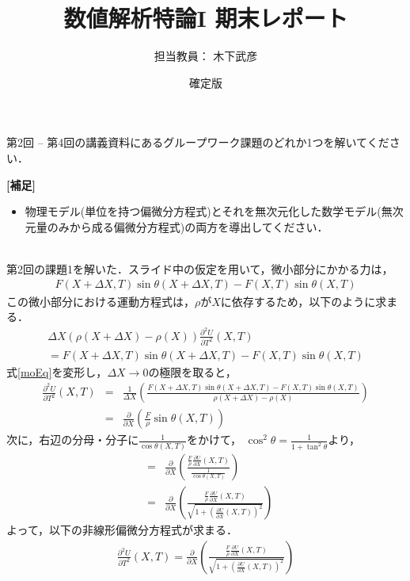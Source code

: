 \documentclass{jarticle}
\title{数値解析特論I 期末レポート}
\author{担当教員： 木下武彦}
\date{確定版}
\newcommand{\prob}[1]{\fbox{\Large \,#1\,}}
\newcommand{\ans}[0]{\fbox{解答}\\}
\begin{document}
\maketitle
\prob{1} 第2回 -- 第4回の講義資料にあるグループワーク課題のどれか1つを解いてください．

\textbf{[補足]}
\begin{itemize}
\item 物理モデル(単位を持つ偏微分方程式)とそれを無次元化した数学モデル(無次元量のみから成る偏微分方程式)の両方を導出してください．
\end{itemize}

\ans{}
第2回の課題1を解いた．スライド中の仮定を用いて，微小部分にかかる力は，
\begin{eqnarray}
  F(X + \Delta X, T) \sin\theta(X + \Delta X, T) - F(X, T) \sin\theta(X, T)
  \label{braEq}
\end{eqnarray}
この微小部分における運動方程式は，$\rho$が$X$に依存するため，以下のように求まる．
\begin{eqnarray}
  \Delta X( \rho(X+\Delta X) - \rho(X) ) \frac{ \partial^2 U }{ \partial T^2 }(X,T) \nonumber \\
  = F(X + \Delta X, T) \sin\theta(X + \Delta X, T) - F(X, T) \sin\theta(X, T)
  \label{moEq}
\end{eqnarray}
式\ref{moEq}を変形し，$\Delta X \rightarrow 0$の極限を取ると，
\begin{eqnarray*}
  \frac{ \partial^2 U }{ \partial T^2 }(X,T) &=&
  \frac{1}{\Delta X} \left( \frac{ F(X + \Delta X, T) \sin\theta(X + \Delta X, T) - F(X, T) \sin\theta(X, T) }{ \rho(X+\Delta X) - \rho(X) } \right) \\
  &=& \frac{\partial}{\partial X} \left( \frac{F}{\rho} \sin\theta(X, T) \right)
\end{eqnarray*}
次に，右辺の分母・分子に$\frac{1}{\cos\theta(X, T)}$をかけて，
$\cos^2\theta = \frac{1}{1 + \tan^2\theta}$より，
\begin{eqnarray*}
  &=& \frac{\partial}{\partial X} \left( \frac{ \frac{F}{\rho} \frac{\partial U}{\partial X}(X,T) }{\frac{1}{\cos\theta(X, T)}} \right) \\
  &=& \frac{\partial}{\partial X} \left( \frac{ \frac{F}{\rho} \frac{\partial U}{\partial X}(X,T) }{\sqrt{1 + \left( \frac{\partial U}{\partial X}(X,T) \right)^2 }} \right)
\end{eqnarray*}
よって，以下の非線形偏微分方程式が求まる．
\begin{eqnarray}
  \frac{ \partial^2 U }{ \partial T^2 }(X,T) = \frac{\partial}{\partial X} \left( \frac{ \frac{F}{\rho} \frac{\partial U}{\partial X}(X,T) }{\sqrt{1 + \left( \frac{\partial U}{\partial X}(X,T) \right)^2 }} \right)
  \label{parEq}
\end{eqnarray}
\end{document}

